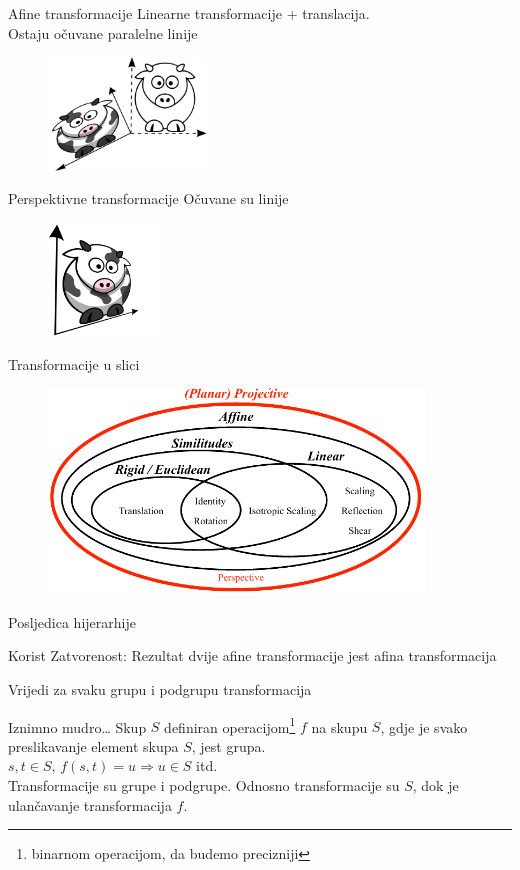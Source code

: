 \documentclass[9pt]{beamer}
\begin{document}
\begin{frame}{Afine transformacije}
	Linearne transformacije + translacija.\\
	Ostaju očuvane paralelne linije
	\begin{figure}
		\includegraphics[height=3cm]{slike/funny_cow_complex_transform.png}
	\end{figure} 
\end{frame}

\begin{frame}{Perspektivne transformacije}
	Očuvane su linije
	\begin{figure}
		\includegraphics[height=3cm]{slike/funny_cow_perspective.png}
	\end{figure}
\end{frame}

\begin{frame}{Transformacije u slici}
	\begin{figure}
		\includegraphics[width=10cm]{slike/tansformacije_tipovi.png}
	\end{figure}
\end{frame}

\begin{frame}{Posljedica hijerarhije}
	\begin{block}{Korist}
		Zatvorenost: Rezultat dvije afine transformacije jest afina transformacija
	\end{block}
	Vrijedi za svaku grupu i podgrupu transformacija
	\begin{block}{Iznimno mudro\ldots}
			Skup $S$ definiran operacijom\footnote[frame]{binarnom operacijom, da budemo precizniji} $f$ na skupu $S$, gdje je svako preslikavanje element skupa $S$, jest grupa.\\
			$s,t \in S$, $f(s,t) = u \Rightarrow u \in S$ itd.\\
			Transformacije su grupe i podgrupe. Odnosno transformacije su $S$, dok je ulančavanje transformacija $f$.
	\end{block}
\end{frame}
\end{document}
